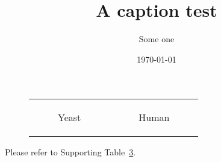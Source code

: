 \documentclass{article}
\title{A caption test}
\author{Some one}
\date{\today}
\begin{document}
\setlength\fboxsep{0pt}
\setlength\fboxrule{0.5pt}

\begin{figure}
\begin{tabular}{cc}
  \begin{subfigure}[b]{0.5\textwidth}   %
  \fbox{\includegraphics[width=\textwidth, trim=25cm 3cm -5cm 0cm, clip=true]
    {YeastExpFluxCompare}}
  \vspace{3mm} \caption{Yeast} \label{fig:FluxExpCmp:A}
  \end{subfigure}
&
  \begin{subfigure}[b]{0.5\textwidth}
  \fbox{\includegraphics[width=\textwidth, trim=25cm 3cm -5cm 0cm, clip=true]
    {HumanExpFluxCompare}}
  \vspace{3mm} \caption{Human} \label{fig:FluxExpCmp:B}
  \end{subfigure}
\\
\end{tabular}
\caption{\blindtext}
\label{fig:FluxExpCmp}
\end{figure}

Please refer to Supporting Table~\ref{fig:FluxExpCmp}.
\end{document}
